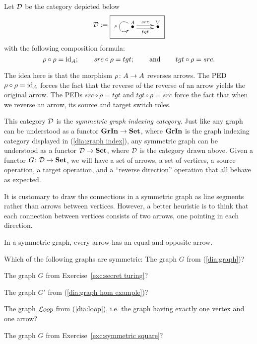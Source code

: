 \documentclass[CT4S-EN-RU]{subfiles}
\begin{document}
\begin{blockRUS}
\end{blockRUS}

\begin{exampleENG}
Let $\mathcal{D}$ be the category depicted below
\begin{align}\label{dia:symmetric graph index}
\mcD:=\fbox{\xymatrix{\LMO{A}\ar@(lu,ld)[]_\rho\ar@<.5ex>[r]^{src}\ar@<-.5ex>[r]_{tgt}&\LMO{V}}}
\end{align}
with the following composition formula: 
$$\rho\circ\rho=\textnormal{id}_A;\hspace{.3in} src\circ\rho=tgt;\hspace{.3in}\textnormal{and}\hspace{.3in} tgt\circ\rho=src.$$

The idea here is that the morphism $\rho\colon A\rightarrow A$ reverses arrows. The PED $\rho\circ\rho=\textnormal{id}_A$ forces the fact that the reverse of the reverse of an arrow yields the original arrow. The PEDs $src\circ\rho=tgt$ and $tgt\circ\rho=src$ force the fact that when we reverse an arrow, its source and target switch roles. 

This category $\mathcal{D}$ is the {\em symmetric graph indexing category}. Just like any graph can be understood as a functor ${\mathbf{GrIn}}\rightarrow{\mathbf{Set}}$, where ${\mathbf{GrIn}}$ is the graph indexing category displayed in (\ref{dia:graph index}), any symmetric graph can be understood as a functor $\mathcal{D}\rightarrow{\mathbf{Set}}$, where $\mathcal{D}$ is the category drawn above. Given a functor $G\colon\mathcal{D}\rightarrow{\mathbf{Set}}$, we will have a set of arrows, a set of vertices, a source operation, a target operation, and a “reverse direction” operation that all behave as expected.

It is customary to draw the connections in a symmetric graph as line segments rather than arrows between vertices. However, a better heuristic is to think that each connection between vertices consists of two arrows, one pointing in each direction. 
\end{exampleENG}

\begin{exampleRUS}
\end{exampleRUS}

\begin{sloganENG}
In a symmetric graph, every arrow has an equal and opposite arrow.
\end{sloganENG}

\begin{sloganRUS}
\end{sloganRUS}

\begin{exerciseENG}
Which of the following graphs are symmetric:
\sexc The graph $G$ from (\ref{dia:graph})?
\item The graph $G$ from Exercise~\ref{exc:secret turing}?
\item The graph $G'$ from (\ref{dia:graph hom example})?
\item The graph ${\mathcal{L} oop}$ from (\ref{dia:loop}), i.e. the graph having exactly one vertex and one arrow?
\item The graph $G$ from Exercise~\ref{exc:symmetric square}?
\endsexc
\end{exerciseENG}
\end{document}
